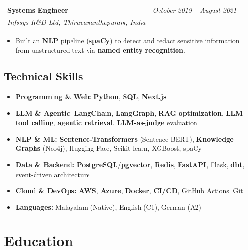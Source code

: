 \documentclass[a4paper,11pt]{article}
\makeatletter
\newcommand{\resumeSubheading}[4]{
  \vspace{4pt}
  \begin{tabular*}{\textwidth}{l@{\extracolsep{\fill}}r}
    \textbf{#1} & \textit{\small #4} \\
    \textit{\small #3} & \small #2 \\
  \end{tabular*}\vspace{-4pt}
}
\makeatother
\begin{document}
\vspace{1mm}

\resumeSubheading
{Systems Engineer}{}{Infosys R\&D Ltd, Thiruvananthapuram, India}{October 2019 -- August 2021}
\begin{itemize}[leftmargin=3ex, rightmargin=2ex, noitemsep, labelsep=1.2mm, itemsep=0.7mm]\small
  \item Built an \textbf{NLP} pipeline (\textbf{spaCy}) to detect and redact sensitive information from unstructured text via \textbf{named entity recognition}.
\end{itemize}

\vspace{1mm}

\vspace{1mm}

\begin{samepage}
\section{Technical Skills}
\begin{itemize}[leftmargin=3ex, rightmargin=2ex, noitemsep, labelsep=1.2mm, itemsep=0mm]\small
  \item \textbf{Programming \& Web:} \textbf{Python}, \textbf{SQL}, \textbf{Next.js}
  \item \textbf{LLM \& Agentic:} \textbf{LangChain}, \textbf{LangGraph}, \textbf{RAG optimization}, \textbf{LLM tool calling}, \textbf{agentic retrieval}, \textbf{LLM-as-judge} evaluation
  \item \textbf{NLP \& ML:} \textbf{Sentence-Transformers} (Sentence-BERT), \textbf{Knowledge Graphs} (Neo4j), Hugging Face, Scikit-learn, XGBoost, spaCy
  \item \textbf{Data \& Backend:} \textbf{PostgreSQL}/\textbf{pgvector}, \textbf{Redis}, \textbf{FastAPI}, Flask, \textbf{dbt}, event-driven architecture
  \item \textbf{Cloud \& DevOps:} \textbf{AWS}, \textbf{Azure}, \textbf{Docker}, \textbf{CI/CD}, GitHub Actions, Git
  \item \textbf{Languages:} Malayalam (Native), English (C1), German (A2)
\end{itemize}
\end{samepage}

\newpage

\section{Education}
\end{document}
